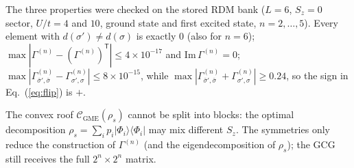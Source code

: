 \documentclass[11pt]{article}
\newcommand{\Cg}{\mathcal{C}_{\mathrm{GME}}}
\newcommand{\rdm}{\Gamma^{(n)}}
\begin{document}
The three properties were checked on the stored RDM bank ($L=6$, $S_z=0$ sector, $U/t=4$ and $10$,
ground state and first excited state, $n=2,\dots,5$). Every element with $d(\sigma')\neq d(\sigma)$ is
exactly $0$ (also for $n=6$); $\max|\rdm-(\rdm)^{\mathsf T}|\le4\times10^{-17}$ and $\mathrm{Im}\,\rdm=0$;
$\max|\rdm_{\bar\sigma',\bar\sigma}-\rdm_{\sigma',\sigma}|\le8\times10^{-15}$, while
$\max|\rdm_{\bar\sigma',\bar\sigma}+\rdm_{\sigma',\sigma}|\ge0.24$, so the sign in Eq.~(\ref{eq:flip}) is $+$.

The convex roof $\Cg(\rho_s)$ cannot be split into blocks: the optimal decomposition
$\rho_s=\sum_i p_i|\Phi_i\rangle\langle\Phi_i|$ may mix different $S_z$. The symmetries only reduce the
construction of $\rdm$ (and the eigendecomposition of $\rho_s$); the GCG still receives the full
$2^n\times2^n$ matrix.
\end{document}
